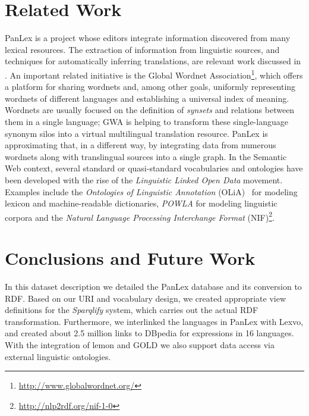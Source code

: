 \documentclass[sw]{iosart2c}
\begin{document}
\section{Related Work}
\label{sec:related}
PanLex is a project whose editors integrate information discovered from many lexical resources.
The extraction of information from linguistic sources, and techniques for automatically inferring translations,
are relevant work discussed in \cite{panlex_probtrans}.
An important related initiative is the Global Wordnet Association\footnote{\url{http://www.globalwordnet.org/}\vspace{0.7em}},
which offers a platform for sharing wordnets and, among other goals, uniformly representing wordnets
of different languages and establishing a universal index of meaning.
Wordnets are usually focused on the
definition of \emph{synsets} and relations between them in a single language; GWA is helping to transform these single-language synonym silos into a virtual multilingual translation resource. PanLex is approximating that, in a different way, by integrating data from numerous wordnets along with translingual sources into a single graph.
In the Semantic Web context, several standard or quasi-standard vocabularies and ontologies have been developed with the rise of the \emph{Linguistic Linked Open Data} movement.
Examples include the
\emph{Ontologies of Linguistic Annotation} (OLiA)~\cite{olia2010} for modeling
lexicon and machine-readable dictionaries, \emph{POWLA} for modeling linguistic corpora\cite{powla2012} and the \emph{Natural Language Processing Interchange Format} (NIF)\footnote{\url{http://nlp2rdf.org/nif-1-0}}.

\section{Conclusions and Future Work}
\label{sec:conclusion}
In this dataset description we detailed the PanLex database and its conversion to RDF.
Based on our URI and vocabulary design, we created appropriate view definitions
for the \emph{Sparqlify} system, which carries out the actual RDF
transformation.
Furthermore, we interlinked the languages in PanLex with Lexvo, and created about 2.5 million links to DBpedia for expressions in 16 languages.
With the integration of lemon and GOLD we also support data access via external linguistic ontologies.
\end{document}
